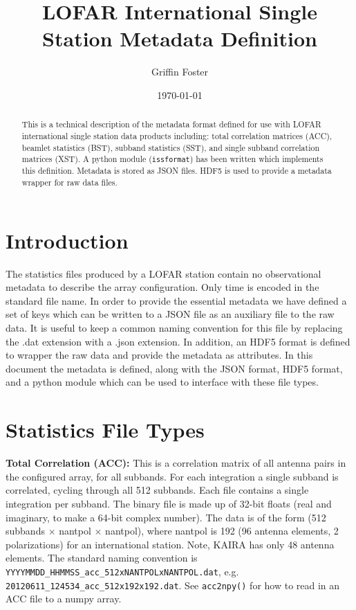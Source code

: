 \documentclass[10pt,a4paper]{article}
\begin{document}
\title{LOFAR International Single Station Metadata Definition}
\author{Griffin Foster}
\date{\today}
\maketitle

\begin{abstract}
This is a technical description of the metadata format defined for use with
LOFAR international single station data products including: total correlation
matrices (ACC), beamlet statistics (BST), subband statistics (SST), and single
subband correlation matrices (XST). A python module (\texttt{issformat}) has
been written which implements this definition. Metadata is stored as JSON files.
HDF5 is used to provide a metadata wrapper for raw data files.
\end{abstract}

\tableofcontents

\section{Introduction}
\label{sec:intro}

The statistics files produced by a LOFAR station contain no observational
metadata to describe the array configuration. Only time is encoded in the
standard file name. In order to provide the essential metadata we have defined a
set of keys which can be written to a JSON file as an auxiliary file to the raw
data. It is useful to keep a common naming convention for this file by replacing
the .dat extension with a .json extension. In addition, an HDF5 format is
defined to wrapper the raw data and provide the metadata as attributes. In this
document the metadata is defined, along with the JSON format, HDF5 format, and a
python module which can be used to interface with these file types.

\section{Statistics File Types}

\noindent\textbf{Total Correlation (ACC):} This is a correlation matrix of all
antenna pairs in the configured array, for all subbands. For each integration a
single subband is correlated, cycling through all 512 subbands. Each file
contains a single integration per subband. The binary file is made up of 32-bit
floats (real and imaginary, to make a 64-bit complex number). The data is of the
form (512 subbands $\times$ nantpol $\times$ nantpol), where nantpol is 192 (96
antenna elements, 2 polarizations) for an international station. Note, KAIRA has
only 48 antenna elements. The standard naming convention is
\texttt{YYYYMMDD\_HHMMSS\_acc\_512xNANTPOLxNANTPOL.dat}, e.g.
\texttt{20120611\_124534\_acc\_512x192x192.dat}. See \texttt{acc2npy()} for how
to read in an ACC file to a numpy array.
\\
\end{document}
